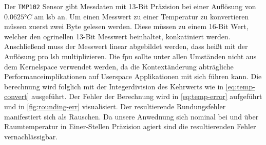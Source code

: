 Der \texttt{TMP102} Sensor gibt Messdaten mit 13-Bit Präzision bei einer Auflösung von $0.0625\si{\degree C}$ am \gls{lsb} an.
Um einen Messwert zu einer Temperatur zu konvertieren müssen zuerst zwei Byte gelesen werden.
Diese müssen zu einem 16-Bit Wert, welcher den ogrinellen 13-Bit Messwert beinhaltet, konkatiniert werden.
Anschlie{\ss}end muss der Messwert linear abgebildet werden, dass hei{\ss}t mit der Auflösung pro \gls{lsb} multiplizieren.
Die \gls{fpu} sollte unter allen Umständen nicht aus dem Kernelspace verwendet werden,
da die Kontextänderung abträgliche Performanceimplikationen auf Userspace Applikationen mit sich führen kann.
Die berechnung wird folglich mit der Integerdivision des Kehrwerts wie in \autoref{eq:temp-convert} ausgeführt.
Der Fehler der Berechnung wird in \autoref{eq:temp-error} aufgeführt und in \autoref{fig:rounding-err} visualisiert.
Der resultierende Rundungsfehler manifestiert sich als Rauschen.
Da unsere Anwednung sich nominal bei und über Raumtemperatur in Einer-Stellen Präzision agiert sind die resultierenden Fehler vernachlässigbar.

